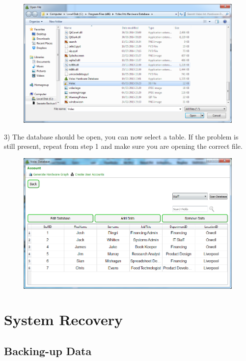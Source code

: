 \begin{figure}[H]
    \includegraphics[width=\textwidth]{./Manual/Images/opendb4.png}
\end{figure}

3) The database should be open, you can now select a table. If the problem is still present, repeat from step 1 and make sure you are opening the correct file.

\begin{figure}[H]
    \includegraphics[width=\textwidth]{./Manual/Images/tabl2.png}
\end{figure}



\section{System Recovery}

\subsection{Backing-up Data}\label{backup}

